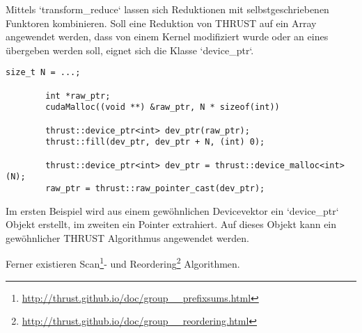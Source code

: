 		Mittels \li`transform_reduce` lassen sich Reduktionen mit selbstgeschriebenen Funktoren kombinieren. Soll eine Reduktion von THRUST auf ein Array angewendet werden, dass von einem \Gls{Kernel} modifiziert wurde oder an eines übergeben werden soll, eignet sich die Klasse \li`device_ptr`.		
		\begin{lstlisting}[caption=THRUST Device Pointer]
		size_t N = ...;

		int *raw_ptr;
		cudaMalloc((void **) &raw_ptr, N * sizeof(int))

		thrust::device_ptr<int> dev_ptr(raw_ptr);
		thrust::fill(dev_ptr, dev_ptr + N, (int) 0);

		thrust::device_ptr<int> dev_ptr = thrust::device_malloc<int>(N);
		raw_ptr = thrust::raw_pointer_cast(dev_ptr);
		\end{lstlisting}	
			
		Im ersten Beispiel wird aus einem gewöhnlichen Devicevektor ein \li`device_ptr` Objekt erstellt, im zweiten ein Pointer extrahiert. Auf dieses Objekt kann ein gewöhnlicher THRUST Algorithmus angewendet werden.
		
		Ferner existieren Scan\footnote{\url{http://thrust.github.io/doc/group__prefixsums.html}}- und Reordering\footnote{\url{http://thrust.github.io/doc/group__reordering.html}} Algorithmen.